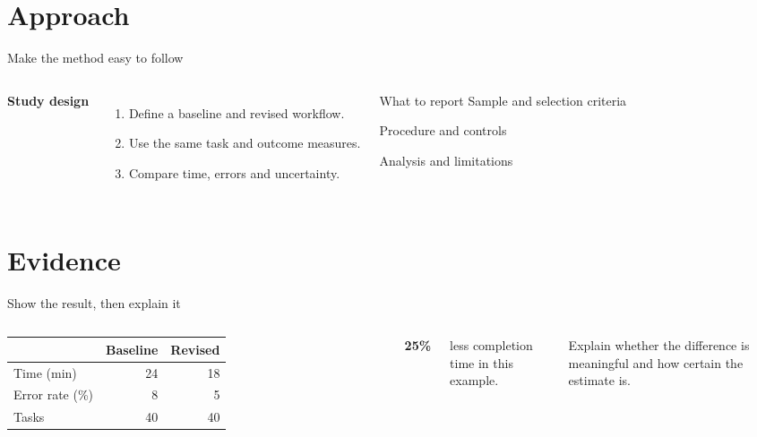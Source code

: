 \documentclass[aspectratio=169,11pt]{beamer}
\begin{document}
\section{Approach}
\begin{frame}{Make the method easy to follow}
\begin{columns}[T,onlytextwidth]
\textbf{Study design}\par\vspace{3mm}
\begin{enumerate}\setlength{\itemsep}{4mm}
\item Define a baseline and revised workflow.
\item Use the same task and outcome measures.
\item Compare time, errors and uncertainty.
\end{enumerate}
\begin{block}{What to report}
Sample and selection criteria\par\medskip
Procedure and controls\par\medskip
Analysis and limitations
\end{block}
\end{columns}
\end{frame}

\section{Evidence}
\begin{frame}{Show the result, then explain it}
\begin{columns}[c,onlytextwidth]
\centering
\begin{tabular}{@{}lrr@{}}
\toprule
& Baseline & Revised\\
\midrule
Time (min) & 24 & 18\\
Error rate (\%) & 8 & 5\\
Tasks & 40 & 40\\
\bottomrule
\end{tabular}
\par{}
{\Huge\bfseries\color{accent}25\%}\par\vspace{2mm}
less completion time in this example.\par\vspace{4mm}
Explain whether the difference is meaningful and how certain the estimate is.
\end{columns}
\end{frame}
\end{document}
